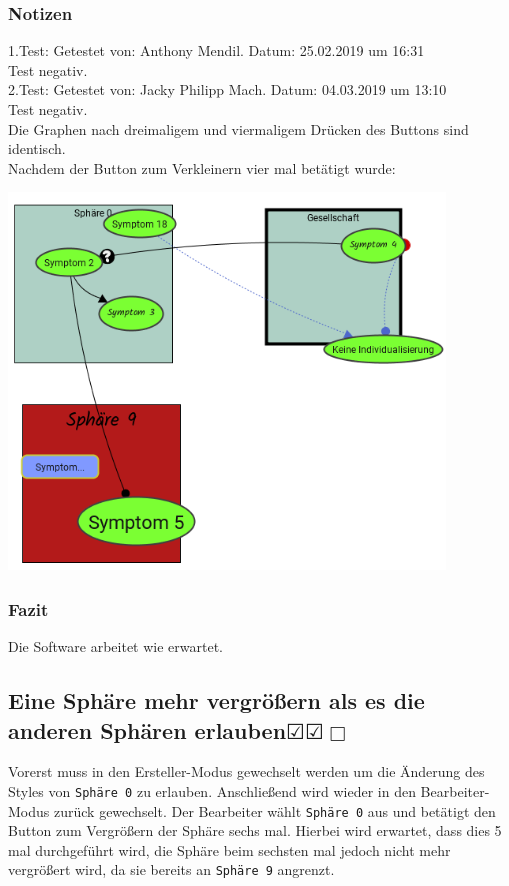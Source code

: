 \documentclass[enabledeprecatedfontcommands]{scrartcl}
\newcommand{\subsectiont}[2]{\subsection[#1]{#1{\normalsize\normalfont #2}}}
\newcommand{\leer}{$\Box$}
\newcommand{\ok}{$\CheckedBox$}
\begin{document}
\subsubsection{Notizen}
1.Test: Getestet von: Anthony Mendil. Datum: 25.02.2019 um 16:31 \\
Test negativ. \\
2.Test: Getestet von: Jacky Philipp Mach. Datum: 04.03.2019 um 13:10 \\
Test negativ.\\
Die Graphen nach dreimaligem und viermaligem Drücken des Buttons sind identisch. \\
Nachdem der Button zum Verkleinern vier mal betätigt wurde: 
\begin{center}
\includegraphics[height=10cm]{3_51.PNG}
\end{center}
\subsubsection{Fazit}
Die Software arbeitet wie erwartet.

\subsectiont{Eine Sphäre mehr vergrößern als es die \\anderen Sphären erlauben}{\dotfill\ok\ok\leer}
Vorerst muss in den Ersteller-Modus gewechselt werden um die Änderung des Styles von \texttt{Sphäre 0} zu erlauben. Anschließend wird wieder in den Bearbeiter-Modus zurück gewechselt. Der Bearbeiter wählt \texttt{Sphäre 0} aus und betätigt den Button zum Vergrößern der Sphäre sechs mal. Hierbei wird erwartet, dass dies 5 mal durchgeführt wird, die Sphäre beim sechsten mal jedoch nicht mehr vergrößert wird, da sie bereits an \texttt{Sphäre 9} angrenzt.
\end{document}
